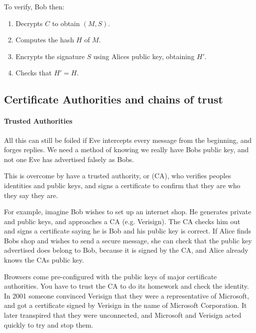 \documentclass[a4paper, 11pt, openany]{book}
\begin{document}
To verify, Bob then:
\begin{enumerate}
    \item Decrypts $C$ to obtain $(M,S)$.

    \item Computes the hash $H$ of $M$.

    \item Encrypts the signature $S$ using Alices public key, obtaining $H'$.

    \item Checks that $H' = H$.
\end{enumerate}

\subsection{Certificate Authorities and chains of trust}

\paragraph{Trusted Authorities}

All this can still be foiled if Eve intercepts every message from the beginning, and forges replies.
We need a method of knowing we really have Bobs public key, and not one Eve has advertised falsely as Bobs.

This is overcome by have a trusted authority, or  (CA), who verifies peoples identities and public keys, and signs a certificate to confirm that they are who they say they are.

For example, imagine Bob wishes to set up an internet shop. He generates private and public keys, and approaches a CA (e.g. Verisign). The CA checks him out and signs a certificate saying he is Bob and his public key is correct. If Alice finds Bobs shop and wishes to send a secure message, she can check that the public key advertised does belong to Bob, because it is signed by the CA, and Alice already knows the CAs public key.

Browsers come pre-configured with the public keys of major certificate authorities. You have to trust the CA to do its homework and check the identity. In 2001 someone convinced Verisign that they were a representative of Microsoft, and got a certificate signed by Verisign in the name of Microsoft Corporation. It later transpired that they were unconnected, and Microsoft and Verisign acted quickly to try and stop them.
\end{document}
